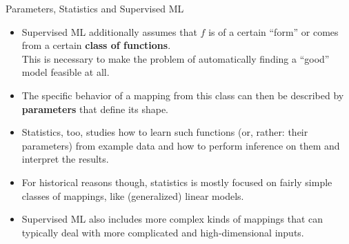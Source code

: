 \documentclass[11pt,compress,t,notes=noshow, xcolor=table]{beamer}
\begin{document}

\begin{vbframe}{Parameters, Statistics and Supervised ML}

\begin{itemize}

  \item Supervised ML additionally assumes that $f$ is of a certain 
  \enquote{form} or comes from a certain \textbf{class of functions}.\\
  This is necessary to make the problem of automatically finding a 
  \enquote{good} model feasible at all.
  
  \item The specific behavior of a mapping from this class can then be 
  described by \textbf{parameters} that define its shape.
  
  \item Statistics, too, studies how to learn such functions (or, rather: their 
  parameters) from example data and how to perform inference on them and 
  interpret the results.
  
  \item For historical reasons though, statistics is mostly focused on fairly 
  simple classes of mappings, like (generalized) linear models.
  
  \item Supervised ML also includes more complex kinds of mappings that can 
  typically deal with more complicated and high-dimensional inputs.

\end{itemize} 

\end{vbframe}


\endlecture
\end{document}
